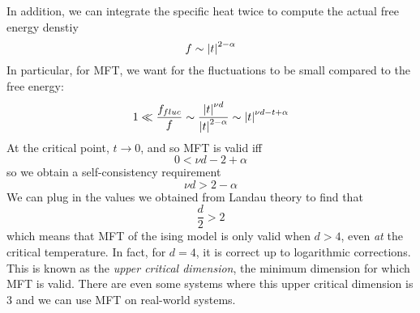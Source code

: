 In addition, we can integrate the specific heat twice to compute the actual free energy denstiy
\[f\sim\left|t\right|^{2-\alpha}\]
In particular, for MFT, we want for the fluctuations to be small compared to the free energy:
\[1\ll\frac{f_{fluc}}{f}\sim\frac{\left|t\right|^{\nu d}}{\left|t\right|^{2-\alpha}}\sim \left|t\right|^{\nu d-t+\alpha}\]
At the critical point, \(t\to0\), and so MFT is valid iff
\[0<\nu d - 2+\alpha\]
so we obtain a self-consistency requirement
\begin{equation}
	\nu d> 2-\alpha
\end{equation}
We can plug in the values we obtained from Landau theory to find that
\[\frac{d}{2}>2\]
which means that MFT of the ising model is only valid when \(d>4\), even \emph{at} the critical temperature. In fact, for \(d=4\), it is correct up to logarithmic corrections. This is known as the \emph{upper critical dimension}, the minimum dimension for which MFT is valid. There are even some systems where this upper critical dimension is \(3\) and we can use MFT on real-world systems.

